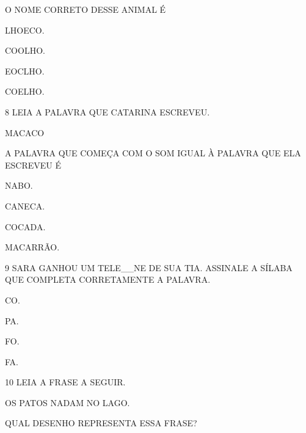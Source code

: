 O NOME CORRETO DESSE ANIMAL É

\begin{escolha}
\item LHOECO.

\item COOLHO.

\item EOCLHO.

\item COELHO.
\end{escolha}

\num{8} LEIA A PALAVRA QUE CATARINA ESCREVEU.

\begin{myquote}
\centering\large{MACACO}
\end{myquote}

A PALAVRA QUE COMEÇA COM O SOM IGUAL À PALAVRA QUE ELA ESCREVEU É 

\begin{multicols}{2}
\begin{escolha}
\item NABO.

\item CANECA.

\item COCADA.

\item MACARRÃO.
\end{escolha}
\end{multicols}

\num{9} SARA GANHOU UM TELE\_\_NE DE SUA TIA. ASSINALE A SÍLABA QUE COMPLETA CORRETAMENTE A PALAVRA.

\begin{multicols}{2}
\begin{escolha}
\item CO.

\item PA.

\item FO.

\item FA.
\end{escolha}
\end{multicols}

\num{10} LEIA A FRASE A SEGUIR.

\begin{myquote}
OS PATOS NADAM NO LAGO.
\end{myquote}

QUAL DESENHO REPRESENTA ESSA FRASE?

